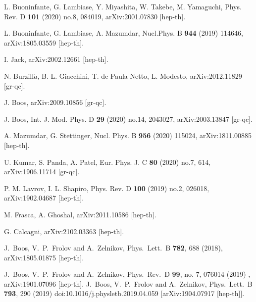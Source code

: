 \documentclass[a4paper,11pt]{article}
\begin{document}
\begin{thebibliography}{99}
L. Buoninfante, G. Lambiase, Y. Miyashita, W. Takebe, M. Yamaguchi, Phys. Rev. D {\bf 101} (2020) no.8, 084019, arXiv:2001.07830 [hep-th].


 L. Buoninfante, G. Lambiase, A. Mazumdar, Nucl.Phys. B {\bf 944} (2019) 114646, arXiv:1805.03559 [hep-th].



 I. Jack,	arXiv:2002.12661 [hep-th].


N. Burzill$\grave{a}$, B. L. Giacchini, T. de Paula Netto, L. Modesto, arXiv:2012.11829 [gr-qc].

	J. Boos, arXiv:2009.10856 [gr-qc].


 J. Boos, Int. J. Mod. Phys. D {\bf 29} (2020) no.14, 2043027, arXiv:2003.13847 [gr-qc].

A. Mazumdar, G. Stettinger, Nucl. Phys. B {\bf 956} (2020) 115024, arXiv:1811.00885 [hep-th].

 U. Kumar, S. Panda, A. Patel, Eur. Phys. J. C {\bf 80} (2020) no.7, 614, arXiv:1906.11714 [gr-qc].


 P. M. Lavrov, I. L. Shapiro, Phys. Rev. D {\bf 100} (2019) no.2, 026018, arXiv:1902.04687 [hep-th].


 M. Frasca, A. Ghoshal, arXiv:2011.10586 [hep-th].

 G. Calcagni, arXiv:2102.03363 [hep-th].










J.~Boos, V.~P.~Frolov and A.~Zelnikov,
Phys.\ Lett.\ B {\bf 782}, 688 (2018), arXiv:1805.01875 [hep-th].

J.~Boos, V.~P.~Frolov and A.~Zelnikov,
Phys.\ Rev.\ D {\bf 99}, no. 7, 076014 (2019)
, arXiv:1901.07096 [hep-th].
J.~Boos, V.~P.~Frolov and A.~Zelnikov,
Phys.\ Lett.\ B {\bf 793}, 290 (2019)
doi:10.1016/j.physletb.2019.04.059
[arXiv:1904.07917 [hep-th]].




\end{thebibliography}
\end{document}
